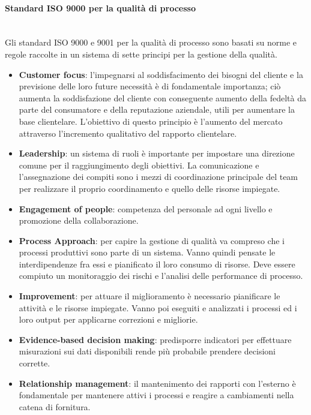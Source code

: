 \paragraph{Standard ISO 9000 per la qualità di processo}\label{sec:iso9000} \mbox{}\\
Gli standard ISO 9000 e 9001 per la qualità di processo sono basati su norme e regole raccolte in un sistema di sette principi per la gestione della qualità.
\begin{itemize}
	\item \textbf{Customer focus}: l'impegnarsi al soddisfacimento dei bisogni del cliente e la previsione delle loro future necessità è di fondamentale importanza; ciò aumenta la soddisfazione del cliente con conseguente aumento della fedeltà da parte del consumatore e della reputazione aziendale, utili per aumentare la base clientelare. L'obiettivo di questo principio è l'aumento del mercato attraverso l'incremento qualitativo del rapporto clientelare. 
	\item \textbf{Leadership}: un sistema di ruoli è importante per impostare una direzione comune per il raggiungimento degli obiettivi. La comunicazione e l'assegnazione dei compiti sono i mezzi di coordinazione principale del team per realizzare il proprio coordinamento e quello delle risorse impiegate.
	\item \textbf{Engagement of people}: competenza del personale ad ogni livello e promozione della collaborazione.
	\item \textbf{Process Approach}: per capire la gestione di qualità va compreso che i processi produttivi sono parte di un sistema. Vanno quindi pensate le interdipendenze fra essi e pianificato il loro consumo di risorse. Deve essere compiuto un monitoraggio dei rischi e l'analisi delle performance di processo.
	\item \textbf{Improvement}: per attuare il miglioramento è necessario pianificare le attività e le risorse impiegate. Vanno poi eseguiti e analizzati i processi ed i loro output per applicarne correzioni e migliorie.
	\item \textbf{Evidence-based decision making}: predisporre indicatori per effettuare misurazioni sui dati disponibili rende più probabile prendere decisioni corrette.
	\item \textbf{Relationship management}: il mantenimento dei rapporti con l'esterno è fondamentale per mantenere attivi i processi e reagire a cambiamenti nella catena di fornitura.
\end{itemize}

